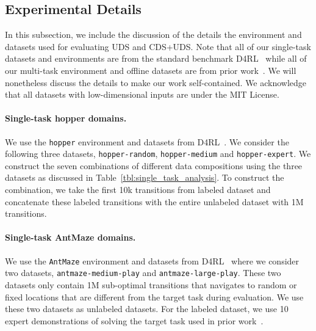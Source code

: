 \subsection{Experimental Details}
\label{app:env_data_details}

In this subsection, we include the discussion of the details the environment and datasets used for evaluating UDS and CDS+UDS. Note that all of our single-task datasets and environments are from the standard benchmark D4RL~\citep{fu2020d4rl} while all of our multi-task environment and offline datasets are from prior work~\citep{yu2021conservative}. We will nonetheless discuss the details to make our work self-contained.  We acknowledge that all datasets with low-dimensional inputs are under the MIT License.

\paragraph{Single-task hopper domains.} We use the \texttt{hopper} environment and datasets from D4RL~\citep{fu2020d4rl}. We consider the following three datasets, \texttt{hopper-random}, \texttt{hopper-medium} and \texttt{hopper-expert}. We construct the seven combinations of different data compositions using the three datasets as discussed in Table~\ref{tbl:single_task_analysis}. To construct the combination, we take the first 10k transitions from labeled dataset and concatenate these labeled transitions with the entire unlabeled dataset with 1M transitions.

\paragraph{Single-task AntMaze domains.} We use the \texttt{AntMaze} environment and datasets from D4RL~\citep{fu2020d4rl} where we consider two datasets, \texttt{antmaze-medium-play} and \texttt{antmaze-large-play}. These two datasets only contain 1M sub-optimal transitions that navigates to random or fixed locations that are different from the target task during evaluation. We use these two datasets as unlabeled datasets. For the labeled dataset, we use 10 expert demonstrations of solving the target task used in prior work~\citep{yang2021trail}.

